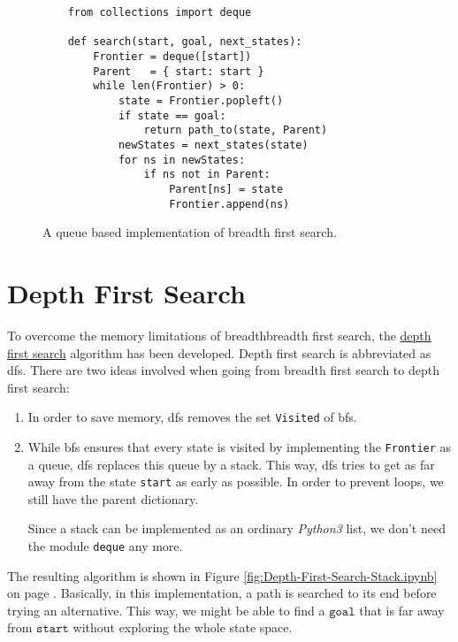 \begin{figure}[!ht]
\centering
\begin{verbatim}
    from collections import deque

    def search(start, goal, next_states):
        Frontier = deque([start])
        Parent   = { start: start }
        while len(Frontier) > 0:
            state = Frontier.popleft()
            if state == goal:
                return path_to(state, Parent)
            newStates = next_states(state)
            for ns in newStates:
                if ns not in Parent:
                    Parent[ns] = state
                    Frontier.append(ns)
\end{verbatim}
\vspace*{-0.3cm}
\caption{A queue based implementation of breadth first search.}
\label{fig:Breadth-First-Search-Queue.ipynb}
\end{figure}



\section{Depth First Search}
To overcome the memory limitations of breadthbreadth first search, the
\href{https://en.wikipedia.org/wiki/Depth-first_search}{depth first search} algorithm 
has been developed.  Depth first search is abbreviated as \ac{dfs}.  There are two ideas involved when going from
breadth first search to depth first search:
\begin{enumerate}
\item In order to save memory, \ac{dfs} removes the set \texttt{Visited} of \ac{bfs}.
\item While \ac{bfs} ensures that every state is visited by implementing the \texttt{Frontier} as a queue,
      \ac{dfs} replaces this queue by a stack.  This way, \ac{dfs} tries to get as far away from the state
      \texttt{start} as early as possible.  In order to prevent loops, we still have the parent dictionary.

      Since a stack can be implemented as an ordinary \textsl{Python3} list, we don't need the module
      \texttt{deque} any more. 
\end{enumerate}
The resulting algorithm is shown in Figure
\ref{fig:Depth-First-Search-Stack.ipynb} on page \pageref{fig:Depth-First-Search-Stack.ipynb}.  Basically, in this
implementation, a path is searched to its end before trying an alternative.  This way, we might be able to find a
$\texttt{goal}$ that is far away from $\texttt{start}$ without exploring the whole state space.

